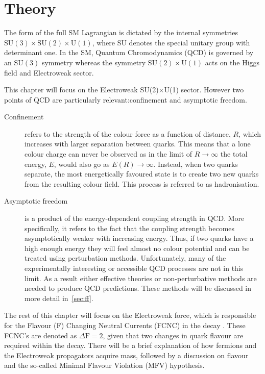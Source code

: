 \chapter{Theory}
\label{chap:theory}
The form of the full \gls{SM} Lagrangian is dictated by the internal symmetries $\mathrm{SU(3)\times SU(2)\times U(1)}$, where \Gls{SU} denotes the special unitary group with determinant one.  In the SM, Quantum Chromodynamics (\Gls{QCD}) is governed by an $\mathrm{SU(3)}$ symmetry whereas the symmetry $\mathrm{SU(2)\times U(1)}$ acts on the Higgs field and Electroweak sector.

This chapter will focus on the Electroweak SU(2)$\times$U(1) sector. However two points of QCD are particularly relevant:confinement and asymptotic freedom.
\begin{description}
\item [Confinement] refers to the strength of the colour force as a function of distance, $R$, which increases with larger separation between quarks. This means that a lone colour charge can never be observed as in the limit of $R\to \infty$ the total energy, $E$, would also go as $E(R)\to \infty$. Instead, when two quarks separate, the most energetically favoured state is to create two new quarks from the resulting colour field. This process is referred to as hadronisation.

\item[Asymptotic freedom] is a product of the energy-dependent coupling strength in QCD. More specifically, it refers to the fact that the coupling strength becomes asymptotically weaker with increasing energy. %
  Thus, if two quarks have a high enough energy they will feel almost no colour potential and can be treated using perturbation methods. Unfortunately, many of the experimentally interesting or accessible QCD processes are not in this limit. As a result either effective theories or non-perturbative methods are needed to produce QCD predictions. These methods will be discussed in more detail in~\autoref{sec:ff}.
 
\end{description}
The rest of this chapter will focus on the Electroweak force, which is responsible for the Flavour (F) Changing Neutral Currents (\Gls{FCNC}) in the decay \Lbpi. These FCNC's are denoted as $\Delta \mathrm{F} = 2$, given that two changes in quark flavour are required within the decay. There will be a brief explanation of how fermions and the Electroweak propagators acquire mass, followed by a discussion on flavour and the so-called Minimal Flavour Violation (\Gls{MFV}) hypothesis.

